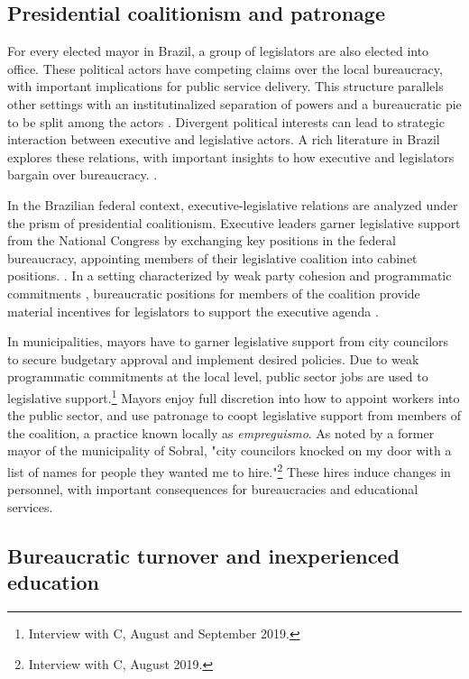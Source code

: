 \subsection*{Presidential coalitionism and patronage}

For every elected mayor in Brazil, a group of legislators are also elected into office. These political actors have competing claims over the local bureaucracy, with important implications for public service delivery. This structure parallels other settings with an institutinalized separation of powers and a bureaucratic pie to be split among the actors \citep{grindle_jobs_2012, mccarty_appointments_2004}. Divergent political interests can lead to strategic interaction between executive and legislative actors. A rich literature in Brazil explores these relations, with important insights to how executive and legislators bargain over bureaucracy. \citet{raile_executive_2011, power_optimism_2010}. 

In the Brazilian federal context, executive-legislative relations are analyzed under the prism of presidential coalitionism. Executive leaders garner legislative support from the National Congress by exchanging key positions in the federal bureaucracy, appointing members of their legislative coalition into cabinet positions. \citep{raile_executive_2011}. In a setting characterized by weak party cohesion and programmatic commitments \citet{ames_electoral_1995, lucas_ideological_2010}, bureaucratic positions for members of the coalition provide material incentives for legislators to support the executive agenda \citet{batista_o_2013, neto_presidential_2006, figueiredo_executivo_1999}.

In municipalities, mayors have to garner legislative support from city councilors to secure budgetary approval and implement desired policies. Due to weak programmatic commitments at the local level, public sector jobs are used to legislative support.\footnote{Interview with C, August and September 2019.} Mayors enjoy full discretion into how to appoint workers into the public sector, and use patronage to coopt legislative support from members of the coalition, a practice known locally as \textit{empreguismo}. As noted by a former mayor of the municipality of Sobral, "city councilors knocked on my door with a list of names for people they wanted me to hire."\footnote{Interview with C, August 2019.} These hires induce changes in personnel, with important consequences for bureaucracies and educational services.

\subsection*{Bureaucratic turnover and inexperienced education}

